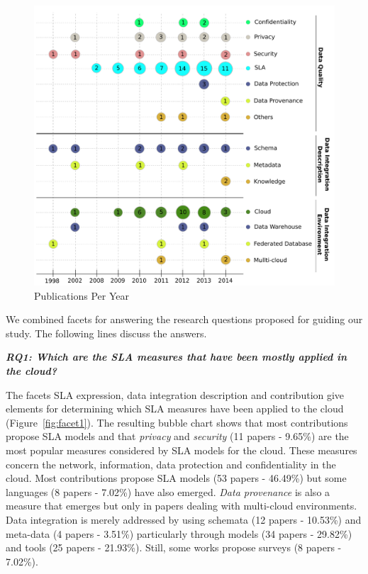 \begin{figure}[ht!]
\centering
\includegraphics[scale=0.33]{figs/bubble-charts/PublicationsPerYear.pdf} 
\caption{Publications Per Year}\label{fig:pubperyear}
\end{figure}

We combined facets for answering the research questions proposed for guiding our
study. The following lines discuss the answers.
 
\textbf{\textit{RQ1: Which are the SLA measures that have been mostly applied 
in the cloud?}}


The facets SLA expression, data integration description and contribution give elements for determining which SLA measures have been applied to the cloud (Figure~\ref{fig:facet1}). 
The resulting bubble chart shows that most contributions propose SLA models and that  \textit{privacy}
and \textit{security} (11 papers - 9.65\%) are the most popular measures considered by SLA models for the cloud. These measures concern the network, information, data protection and confidentiality in the cloud. Most contributions propose SLA models (53 papers - 46.49\%)  but some languages (8 papers - 7.02\%) have also emerged. {\em Data provenance} is also a measure that emerges but only in papers dealing with multi-cloud environments. Data integration is merely addressed by using schemata (12 papers - 10.53\%)  and meta-data (4 papers - 3.51\%) particularly through models (34 papers - 29.82\%) and tools (25 papers - 21.93\%). Still, some works propose surveys (8 papers - 7.02\%).
 
